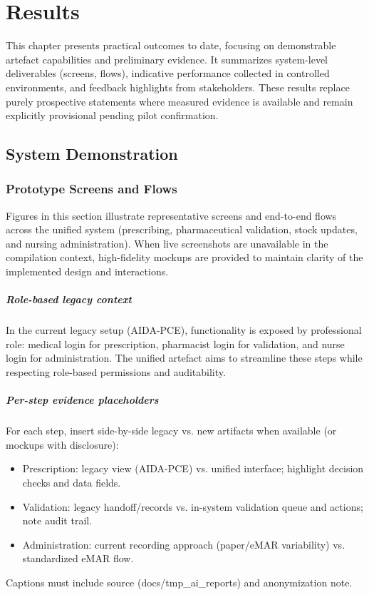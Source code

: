 \chapter{Results}
\label{chap:Results}

This chapter presents practical outcomes to date, focusing on demonstrable artefact capabilities and preliminary evidence. It summarizes system-level deliverables (screens, flows), indicative performance collected in controlled environments, and feedback highlights from stakeholders. These results replace purely prospective statements where measured evidence is available and remain explicitly provisional pending pilot confirmation.

\section{System Demonstration}

\subsection{Prototype Screens and Flows}
Figures in this section illustrate representative screens and end-to-end flows across the unified system (prescribing, pharmaceutical validation, stock updates, and nursing administration). When live screenshots are unavailable in the compilation context, high-fidelity mockups are provided to maintain clarity of the implemented design and interactions.

\paragraph{Role-based legacy context}
In the current legacy setup (AIDA-PCE), functionality is exposed by professional role: medical login for prescription, pharmacist login for validation, and nurse login for administration. The unified artefact aims to streamline these steps while respecting role-based permissions and auditability.

\paragraph{Per-step evidence placeholders}
For each step, insert side-by-side legacy vs. new artifacts when available (or mockups with disclosure):
\begin{itemize}
    \item Prescription: legacy view (AIDA-PCE) vs. unified interface; highlight decision checks and data fields.
    \item Validation: legacy handoff/records vs. in-system validation queue and actions; note audit trail.
    \item Administration: current recording approach (paper/eMAR variability) vs. standardized eMAR flow.
\end{itemize}
Captions must include source (docs/tmp\_ai\_reports) and anonymization note.

